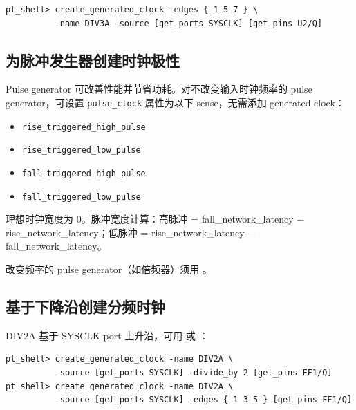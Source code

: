 
\begin{lstlisting}
pt_shell> create_generated_clock -edges { 1 5 7 } \
          -name DIV3A -source [get_ports SYSCLK] [get_pins U2/Q]
\end{lstlisting}

\subsection{为脉冲发生器创建时钟极性}
Pulse generator 可改善性能并节省功耗。对不改变输入时钟频率的 pulse generator，可设置 \texttt{pulse\_clock} 属性为以下 sense，无需添加 generated clock：
\begin{itemize}
  \item \texttt{rise\_triggered\_high\_pulse}
  \item \texttt{rise\_triggered\_low\_pulse}
  \item \texttt{fall\_triggered\_high\_pulse}
  \item \texttt{fall\_triggered\_low\_pulse}
\end{itemize}


理想时钟宽度为 0。脉冲宽度计算：高脉冲 = fall\_network\_latency $-$ rise\_network\_latency；低脉冲 = rise\_network\_latency $-$ fall\_network\_latency。

改变频率的 pulse generator（如倍频器）须用 。


\subsection{基于下降沿创建分频时钟}

DIV2A 基于 SYSCLK port 上升沿，可用  或 ：
\begin{lstlisting}
pt_shell> create_generated_clock -name DIV2A \
          -source [get_ports SYSCLK] -divide_by 2 [get_pins FF1/Q]
pt_shell> create_generated_clock -name DIV2A \
          -source [get_ports SYSCLK] -edges { 1 3 5 } [get_pins FF1/Q]
\end{lstlisting}

